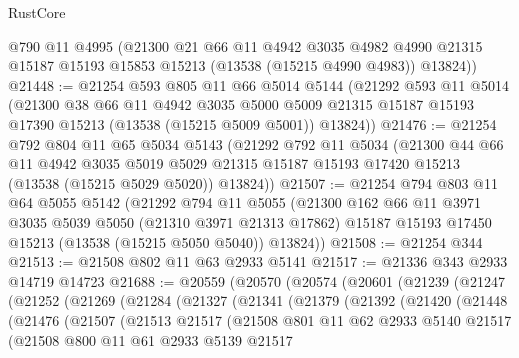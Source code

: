 \begin{lexlean}{RustCore}
\begin{coremodule}
      @790
      @11
      @4995
      (@21300
        @21
        @66
        @11
        @4942
        @3035
        @4982
        @4990
        @21315
        @15187
        @15193
        @15853
        @15213
        (@13538 (@15215 @4990 @4983))
        @13824))
@21448 := @21254
    @593
    @805
    @11
    @66
    @5014
    @5144
    (@21292
      @593
      @11
      @5014
      (@21300
        @38
        @66
        @11
        @4942
        @3035
        @5000
        @5009
        @21315
        @15187
        @15193
        @17390
        @15213
        (@13538 (@15215 @5009 @5001))
        @13824))
@21476 := @21254
    @792
    @804
    @11
    @65
    @5034
    @5143
    (@21292
      @792
      @11
      @5034
      (@21300
        @44
        @66
        @11
        @4942
        @3035
        @5019
        @5029
        @21315
        @15187
        @15193
        @17420
        @15213
        (@13538 (@15215 @5029 @5020))
        @13824))
@21507 := @21254
    @794
    @803
    @11
    @64
    @5055
    @5142
    (@21292
      @794
      @11
      @5055
      (@21300
        @162
        @66
        @11
        @3971
        @3035
        @5039
        @5050
        (@21310 @3971 @21313 @17862)
        @15187
        @15193
        @17450
        @15213
        (@13538 (@15215 @5050 @5040))
        @13824))
@21508 := @21254 @344
@21513 := @21508 @802 @11 @63 @2933 @5141
@21517 := @21336 @343 @2933 @14719 @14723
@21688 := @20559
    (@20570
      (@20574
        (@20601
          (@21239
            (@21247
              (@21252
                (@21269
                  (@21284
                    (@21327
                      (@21341
                        (@21379
                          (@21392
                            (@21420
                              (@21448
                                (@21476
                                  (@21507
                                    (@21513
                                      @21517
                                      (@21508
                                        @801
                                        @11
                                        @62
                                        @2933
                                        @5140
                                        @21517
                                        (@21508
                                          @800
                                          @11
                                          @61
                                          @2933
                                          @5139
                                          @21517

\end{coremodule}
\end{lexlean}
